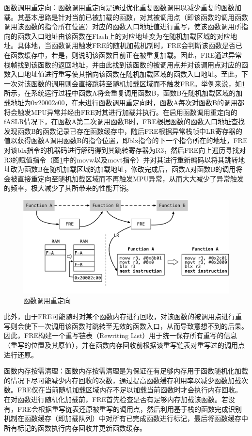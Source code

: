 \documentclass[12pt,a4paper]{ctexart}
\numberwithin{figure}{section}
\begin{document}
\par 函数调用重定向：函数调用重定向是通过优化重复函数调用以减少重复的函数加载。其基本思路是针对当前已被加载的函数，对其被调用点（即该函数的调用函数调用该函数的指令所在位置）对应的函数入口地址值进行重写，使该函数调用所指向的函数入口地址由该函数在Flash上的对应地址变为在随机加载区域的对应地址。具体地，当函数调用触发FRE的随机加载机制时，FRE会判断该函数是否已在函数缓存中，若是，则说明该函数目前正在被重复加载。因此，FRE通过异常栈帧找到该函数的返回地址，并由此找到该函数的被调用点并对该调用点对应的函数入口地址值进行重写使其指向该函数在随机加载区域的函数入口地址。至此，下一次对该函数的调用则会直接跳转至随机加载区域而不触发FRE。举例来说，如\ref{fig:redirection}所示，在系统运行过程中函数A将会重复调用函数B，函数B在随机加载区域的加载地址为0x20002c00，在未进行函数调用重定向时，函数A每次对函数B的调用都将会触发MPU异常并经由FRE对其进行加载并执行。在启用函数调用重定向的fASLR情况下，在函数A第二次调用函数B时，FRE根据函数的函数入口地址查找发现函数B的函数记录已存在函数缓存中，随后FRE根据异常栈帧中LR寄存器的值以获得函数A调用函数B的指令位置，即blx指令的下一个指令所在的地址，FRE对该blx指令的机器码进行解码得到其跳转寄存器为R3，然后FRE向上遍历寻找对R3的赋值指令（图\ref{fig:redirection}中的movw以及movt指令）并对其进行重新编码以将其跳转地址改为函数B在随机加载区域的加载地址，修改完成后，函数A对函数B的调用将会被直接重定向至随机加载区域而不再触发MPU异常，从而大大减少了异常触发的频率，极大减少了其所带来的性能开销。
\begin{figure}[H]
    \centering
    \includegraphics[scale=0.5]{graph/redirection.png}
    \caption{函数调用重定向}
    \label{fig:redirection}
\end{figure}
\par 此外，由于FRE可能随时对某个函数内存进行回收，对该函数的被调用点进行重写则会使下一次调用该函数时跳转至无效的函数入口，从而导致意想不到的后果。因此，FRE构建一个重写链表（Rewriting List）用于统一保存所有重写的信息（重写的位置及其原值），并在函数内存回收前根据该重写链表对重写过的调用点进行还原。
\par 函数内存按需清理：函数内存按需清理是为保证在有足够内存用于函数随机化加载的情况下尽可能减少内存回收的次数，通过提高函数缓存利用率以减少函数加载次数。FRE仅在当前随机加载区域内存不足以加载当前函数时才会执行内存回收。在对函数进行随机化加载前，FRE首先检查是否有足够内存加载该函数。若没有，FRE会根据重写链表还原被重写的调用点，然后利用基于栈的函数完成识别机制在函数缓存（即加载队列）中对所有已完成函数进行标记，最后将函数缓存中所有标记的函数执行内存回收并更新函数缓存。
\end{document}
